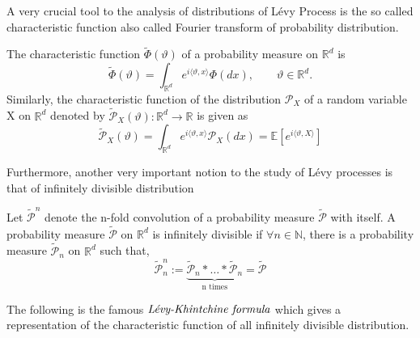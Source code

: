A very crucial tool to the analysis of distributions of L\'evy Process is the so called characteristic function also called Fourier transform of probability distribution.
\begin{definition} The characteristic function $\tilde{\Phi}(\vartheta)$ of a probability measure on $\mathbb{R}^d$ is
\begin{equation}
    \tilde{\Phi}(\vartheta) = \int_{\mathbb{R}^d} e^{i\langle \vartheta,x \rangle} \Phi(dx), \qquad \vartheta \in \mathbb{R}^d.
\end{equation}
Similarly, the characteristic function of the distribution $\mathcal{P}_X$ of a random variable X on $\mathbb{R}^d$ denoted by $\tilde{\mathcal{P}}_X(\vartheta): \mathbb{R}^d \rightarrow  \mathbb{R} $ is given as 
\begin{equation}
\tilde{\mathcal{P}}_X(\vartheta) =  \int_{\mathbb{R}^d} e^{i\langle \vartheta,x \rangle}\mathcal{P}_X(dx) = \mathbb{E}[e^{i\langle \vartheta,X \rangle}]
\end{equation}
\end{definition}
Furthermore, another very important notion to the study of L\'evy processes is that of infinitely divisible distribution
\begin{definition}
Let $\tilde{\mathcal{P}}^n$ denote the n-fold convolution of a probability measure $\tilde{\mathcal{P}}$ with itself. A probability measure $\tilde{\mathcal{P}}$ on  $\mathbb{R}^d$ is infinitely divisible if  $\forall n \in \mathbb{N}$, there is a probability measure $\tilde{\mathcal{P}}_n$ on $\mathbb{R}^d$
such that, $$\tilde{\mathcal{P}}^n_n := \underbrace{\tilde{\mathcal{P}}_n * \ldots *\tilde{\mathcal{P}}_n}_\text{n times} = \tilde{\mathcal{P}} $$ 
\end{definition}
The following is the famous $\emph{L\'evy-Khintchine formula} $ which gives a representation of the characteristic function of all infinitely divisible distribution.
